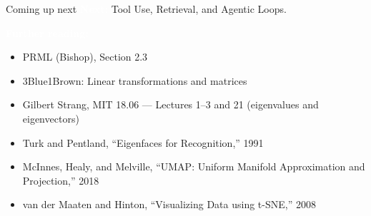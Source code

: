 \documentclass[aspectratio=169]{beamer}
\renewcommand{\textbf}[1]{\textcolor{white}{\bfseries #1}}
\begin{document}
\begin{frame}[c]{Coming up next}
\textbf{Next:} Tool Use, Retrieval, and Agentic Loops.

\vspace{1em}
\textbf{Further reading:}
\begin{itemize}
    \item PRML (Bishop), Section 2.3
    \item 3Blue1Brown: Linear transformations and matrices
    \item Gilbert Strang, MIT 18.06 --- Lectures 1--3 and 21 (eigenvalues and eigenvectors)
    \item Turk and Pentland, ``Eigenfaces for Recognition,'' 1991
    \item McInnes, Healy, and Melville, ``UMAP: Uniform Manifold Approximation and Projection,'' 2018
    \item van der Maaten and Hinton, ``Visualizing Data using t-SNE,'' 2008
\end{itemize}
\end{frame}
\end{document}
